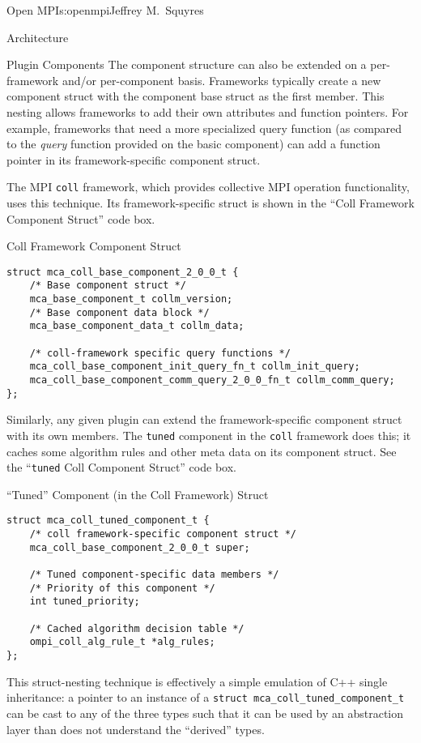 \begin{aosachapter}{Open MPI}{s:openmpi}{Jeffrey M.\ Squyres}
\begin{aosasect1}{Architecture}
\begin{aosasect2}{Plugin Components}
The component structure can also be extended on a per-framework and/or
per-component basis.  Frameworks typically create a new component
struct with the component base struct as the first member.
%
This nesting allows frameworks to add their own attributes and
function pointers.  
%
For example, frameworks that need a more specialized query function
(as compared to the {\em query} function provided on the basic
component) can add a function pointer in its framework-specific
component struct.

The MPI {\tt coll} framework, which provides collective MPI operation
functionality, uses this technique.  Its framework-specific struct is
shown in the ``Coll Framework Component Struct'' code box.

\begin{aosabox}{Coll Framework Component Struct}
\begin{verbatim}
struct mca_coll_base_component_2_0_0_t {
    /* Base component struct */
    mca_base_component_t collm_version;
    /* Base component data block */
    mca_base_component_data_t collm_data;

    /* coll-framework specific query functions */
    mca_coll_base_component_init_query_fn_t collm_init_query;
    mca_coll_base_component_comm_query_2_0_0_fn_t collm_comm_query;
};
\end{verbatim}
\end{aosabox}

Similarly, any given plugin can extend the framework-specific
component struct with its own members.  
%
The {\tt tuned} component in the {\tt coll} framework does this; it
caches some algorithm rules and other meta data on its component
struct.  See the ``{\tt tuned} Coll Component Struct'' code box.

\begin{aosabox}{``Tuned'' Component (in the Coll Framework) Struct}
\begin{verbatim}
struct mca_coll_tuned_component_t {
    /* coll framework-specific component struct */ 
    mca_coll_base_component_2_0_0_t super;

    /* Tuned component-specific data members */
    /* Priority of this component */
    int tuned_priority;
    
    /* Cached algorithm decision table */
    ompi_coll_alg_rule_t *alg_rules;
};
\end{verbatim}
\end{aosabox}

This struct-nesting technique is effectively a simple emulation of C++
single inheritance: a pointer to an instance of a {\tt struct
  mca\_\-coll\_\-tuned\_\-component\_\-t} can be cast to any of the
three types such that it can be used by an abstraction layer than does
not understand the ``derived'' types.


\end{aosasect2}
\end{aosasect1}
\end{aosachapter}
